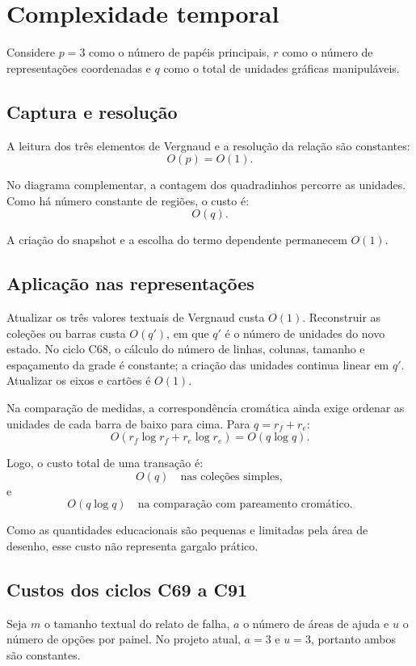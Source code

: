\documentclass[12pt,a4paper]{article}
\begin{document}
\section{Complexidade temporal}

Considere $p=3$ como o número de papéis principais, $r$ como o número de representações coordenadas e $q$ como o total de unidades gráficas manipuláveis.

\subsection{Captura e resolução}

A leitura dos três elementos de Vergnaud e a resolução da relação são constantes:
\[
O(p)=O(1).
\]

No diagrama complementar, a contagem dos quadradinhos percorre as unidades. Como há número constante de regiões, o custo é:
\[
O(q).
\]

A criação do snapshot e a escolha do termo dependente permanecem $O(1)$.

\subsection{Aplicação nas representações}

Atualizar os três valores textuais de Vergnaud custa $O(1)$. Reconstruir as coleções ou barras custa $O(q')$, em que $q'$ é o número de unidades do novo estado. No ciclo C68, o cálculo do número de linhas, colunas, tamanho e espaçamento da grade é constante; a criação das unidades continua linear em $q'$. Atualizar os eixos e cartões é $O(1)$.

Na comparação de medidas, a correspondência cromática ainda exige ordenar as unidades de cada barra de baixo para cima. Para $q=r_f+r_e$:
\[
O(r_f\log r_f+r_e\log r_e)=O(q\log q).
\]

Logo, o custo total de uma transação é:
\[
O(q) \quad \text{nas coleções simples},
\]
e
\[
O(q\log q) \quad \text{na comparação com pareamento cromático}.
\]

Como as quantidades educacionais são pequenas e limitadas pela área de desenho, esse custo não representa gargalo prático.

\subsection{Custos dos ciclos C69 a C91}
Seja $m$ o tamanho textual do relato de falha, $a$ o número de áreas de ajuda e $u$ o número de opções por painel. No projeto atual, $a=3$ e $u=3$, portanto ambos são constantes.
\end{document}
